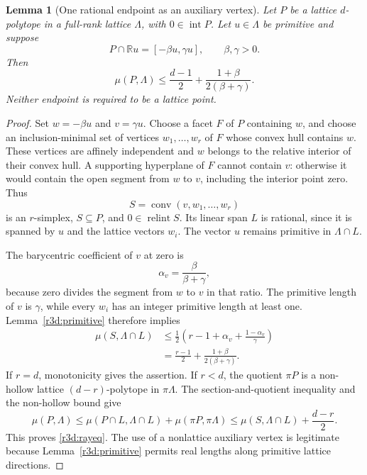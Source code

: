 \documentclass[11pt,a4paper]{article}
\newtheorem{lemma}[theorem]{Lemma}
\theoremstyle{remark}\newtheorem{remark}[theorem]{Remark}
\DeclareMathOperator{\conv}{conv}
\DeclareMathOperator{\inter}{int}
\newcommand{\R}{\mathbb R}\newcommand{\Z}{\mathbb Z}\newcommand{\Q}{\mathbb Q}
\begin{document}
\begin{lemma}[One rational endpoint as an auxiliary vertex]
\label{r3d:ray}
Let $P$ be a lattice $d$-polytope in a full-rank lattice $\Lambda$,
with $0\in\inter P$.  Let $u\in\Lambda$ be primitive and suppose
\[
 P\cap\R u=[-\beta u,\gamma u],\qquad \beta,\gamma>0.
\]
Then
\begin{equation}\label{r3d:rayeq}
 \mu(P,\Lambda)\le
 \frac{d-1}{2}+\frac{1+\beta}{2(\beta+\gamma)}.
\end{equation}
Neither endpoint is required to be a lattice point.
\end{lemma}
\begin{proof}
Set $w=-\beta u$ and $v=\gamma u$.  Choose a facet $F$ of $P$
containing $w$, and choose an inclusion-minimal set of vertices
$w_1,\ldots,w_r$ of $F$ whose convex hull contains $w$.  These vertices
are affinely independent and $w$ belongs to the relative interior of
their convex hull.  A supporting hyperplane of $F$ cannot contain
$v$: otherwise it would contain the open segment from $w$ to $v$,
including the interior point zero.  Thus
\[
 S=\conv(v,w_1,\ldots,w_r)
\]
is an $r$-simplex, $S\subseteq P$, and $0\in\operatorname{relint}S$.
Its linear span $L$ is rational, since it is spanned by $u$ and the
lattice vectors $w_i$.  The vector $u$ remains primitive in
$\Lambda\cap L$.

The barycentric coefficient of $v$ at zero is
\[
 \alpha_v=\frac{\beta}{\beta+\gamma},
\]
because zero divides the segment from $w$ to $v$ in that ratio.
The primitive length of $v$ is $\gamma$, while every $w_i$ has an
integer primitive length at least one.  Lemma~\ref{r3d:primitive}
therefore implies
\begin{align*}
 \mu(S,\Lambda\cap L)
 &\le \frac12\left(r-1+\alpha_v+
                  \frac{1-\alpha_v}{\gamma}\right)\\
 &=\frac{r-1}{2}+\frac{1+\beta}{2(\beta+\gamma)}.
\end{align*}
If $r=d$, monotonicity gives the assertion.  If $r<d$, the quotient
$\pi P$ is a non-hollow lattice $(d-r)$-polytope in $\pi\Lambda$.
The section-and-quotient inequality and the non-hollow bound give
\[
 \mu(P,\Lambda)
 \le \mu(P\cap L,\Lambda\cap L)+\mu(\pi P,\pi\Lambda)
 \le \mu(S,\Lambda\cap L)+\frac{d-r}{2}.
\]
This proves \eqref{r3d:rayeq}.  The use of a nonlattice auxiliary vertex
is legitimate because Lemma~\ref{r3d:primitive} permits real lengths
along primitive lattice directions.
\end{proof}
\end{document}
